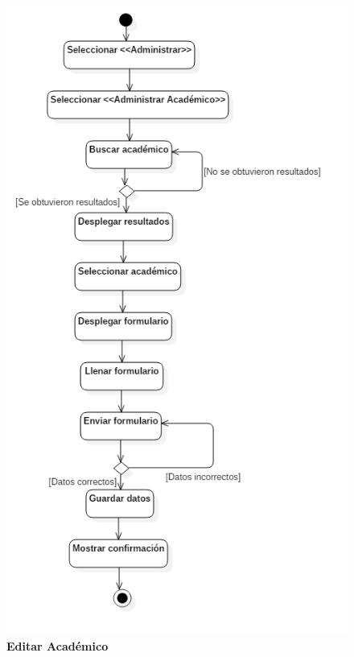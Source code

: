 \begin{figure}[H]
  \centering
    \includegraphics[scale=.8,angle=0]{project/Actividades/editar_academico.png}
  \caption{\textbf{Editar Académico}}
\end{figure}
